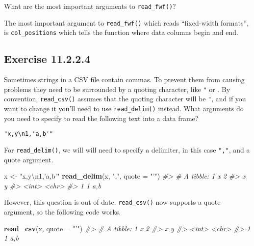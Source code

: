 \documentclass[]{book}
\newenvironment{Shaded}{\begin{snugshade}}{\end{snugshade}}
\newcommand{\CharTok}[1]{\textcolor[rgb]{0.31,0.60,0.02}{#1}}
\newcommand{\CommentTok}[1]{\textcolor[rgb]{0.56,0.35,0.01}{\textit{#1}}}
\newcommand{\DataTypeTok}[1]{\textcolor[rgb]{0.13,0.29,0.53}{#1}}
\newcommand{\KeywordTok}[1]{\textcolor[rgb]{0.13,0.29,0.53}{\textbf{#1}}}
\newcommand{\NormalTok}[1]{#1}
\newcommand{\StringTok}[1]{\textcolor[rgb]{0.31,0.60,0.02}{#1}}
\theoremstyle{plain}
\theoremstyle{remark}
\begin{document}
What are the most important arguments to \texttt{read\_fwf()}?

The most important argument to \texttt{read\_fwf()} which reads
``fixed-width formats'', is \texttt{col\_positions} which tells the
function where data columns begin and end.

\hypertarget{exercise-11.2.2.4}{%
\subsection*{\texorpdfstring{Exercise
{11.2.2.4}}{Exercise 11.2.2.4}}\label{exercise-11.2.2.4}}

Sometimes strings in a CSV file contain commas. To prevent them from
causing problems they need to be surrounded by a quoting character, like
\texttt{"} or \texttt{\textquotesingle{}}. By convention,
\texttt{read\_csv()} assumes that the quoting character will be
\texttt{"}, and if you want to change it you'll need to use
\texttt{read\_delim()} instead. What arguments do you need to specify to
read the following text into a data frame?

\begin{verbatim}
"x,y\n1,'a,b'"
\end{verbatim}

For \texttt{read\_delim()}, we will will need to specify a delimiter, in
this case \texttt{","}, and a quote argument.

\begin{Shaded}
\begin{Highlighting}[]
\NormalTok{x <-}\StringTok{ "x,y}\CharTok{\textbackslash{}n}\StringTok{1,'a,b'"}
\KeywordTok{read_delim}\NormalTok{(x, }\StringTok{","}\NormalTok{, }\DataTypeTok{quote =} \StringTok{"'"}\NormalTok{)}
\CommentTok{#> # A tibble: 1 x 2}
\CommentTok{#>       x y    }
\CommentTok{#>   <int> <chr>}
\CommentTok{#> 1     1 a,b}
\end{Highlighting}
\end{Shaded}

However, this question is out of date. \texttt{read\_csv()} now supports
a quote argument, so the following code works.

\begin{Shaded}
\begin{Highlighting}[]
\KeywordTok{read_csv}\NormalTok{(x, }\DataTypeTok{quote =} \StringTok{"'"}\NormalTok{)}
\CommentTok{#> # A tibble: 1 x 2}
\CommentTok{#>       x y    }
\CommentTok{#>   <int> <chr>}
\CommentTok{#> 1     1 a,b}
\end{Highlighting}
\end{Shaded}
\end{document}

